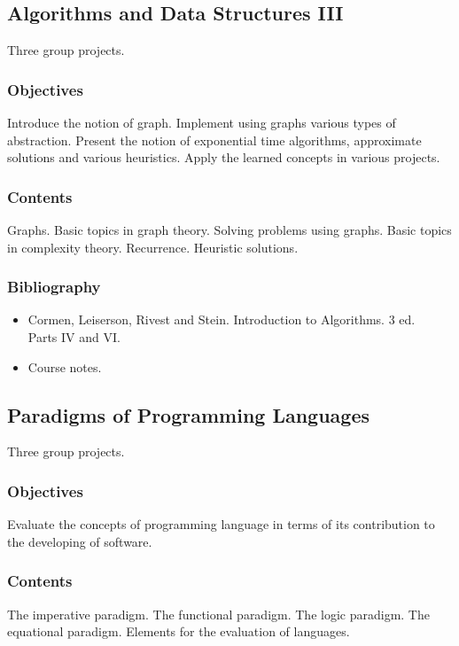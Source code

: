 \documentclass[spanish]{article}
\begin{document}
\hrulefill%

\subsection{Algorithms and Data Structures III}
Three group projects.

\subsubsection{Objectives}
Introduce the notion of graph. Implement using graphs various types
of abstraction. Present the notion of exponential time algorithms,
approximate solutions and various heuristics. Apply the learned concepts
in various projects.

\subsubsection{Contents}
Graphs. Basic topics in graph theory. Solving problems using graphs.
Basic topics in complexity theory. Recurrence. Heuristic solutions.

\subsubsection{Bibliography}
\begin{itemize}
  \item Cormen, Leiserson, Rivest and Stein. Introduction to Algorithms. 3 ed.\\
    Parts IV and VI.
  \item Course notes.
\end{itemize}


\hrulefill%

\subsection{Paradigms of Programming Languages}
Three group projects.

\subsubsection{Objectives}
Evaluate the concepts of programming language in terms of its contribution
to the developing of software.

\subsubsection{Contents}
The imperative paradigm. The functional paradigm. The logic paradigm.
The equational paradigm. Elements for the evaluation of languages.
\end{document}

